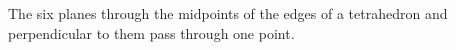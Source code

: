 The six planes through the midpoints of the edges of a tetrahedron and perpendicular to them pass through one point.
